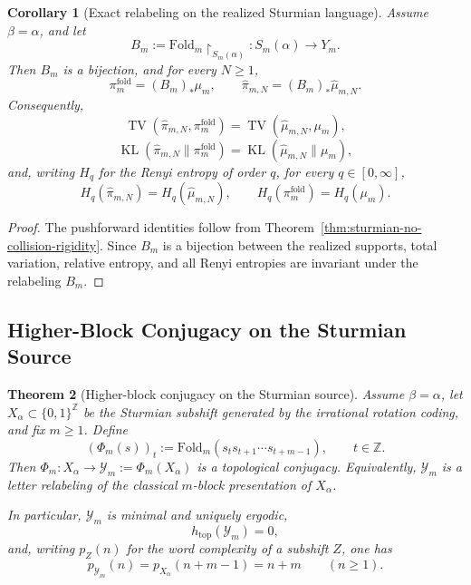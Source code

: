 \documentclass[11pt,letterpaper]{article}
\numberwithin{equation}{section}
\theoremstyle{plain}
\newtheorem{theorem}{Theorem}[section]
\newtheorem{corollary}[theorem]{Corollary}
\theoremstyle{definition}
\theoremstyle{remark}
\newcommand{\Fold}{\mathrm{Fold}}
\DeclareMathOperator{\TV}{TV}
\DeclareMathOperator{\KL}{KL}
\begin{document}
\begin{corollary}[Exact relabeling on the realized Sturmian language]\label{cor:sturmian-exact-relabeling}
Assume \(\beta=\alpha\), and let
\[
B_m:=\Fold_m\!\upharpoonright_{S_m(\alpha)}:S_m(\alpha)\to Y_m.
\]
Then \(B_m\) is a bijection, and for every \(N\ge 1\),
\[
\pi_m^{\mathrm{fold}}=(B_m)_*\mu_m,
\qquad
\hat\pi_{m,N}=(B_m)_*\hat\mu_{m,N}.
\]
Consequently,
\[
\TV(\hat\pi_{m,N},\pi_m^{\mathrm{fold}})
=
\TV(\hat\mu_{m,N},\mu_m),
\]
\[
\KL(\hat\pi_{m,N}\|\pi_m^{\mathrm{fold}})
=
\KL(\hat\mu_{m,N}\|\mu_m),
\]
and, writing \(H_q\) for the Renyi entropy of order \(q\), for every
\(q\in[0,\infty]\),
\[
H_q(\hat\pi_{m,N})=H_q(\hat\mu_{m,N}),
\qquad
H_q(\pi_m^{\mathrm{fold}})=H_q(\mu_m).
\]
\end{corollary}

\begin{proof}
The pushforward identities follow from Theorem~\ref{thm:sturmian-no-collision-rigidity}.
Since \(B_m\) is a bijection between the realized supports, total variation,
relative entropy, and all Renyi entropies are invariant under the relabeling
\(B_m\).
\end{proof}

\subsection{Higher-Block Conjugacy on the Sturmian Source}

\begin{theorem}[Higher-block conjugacy on the Sturmian source]
\label{thm:sequence-level-transparency}
Assume \(\beta=\alpha\), let \(X_\alpha\subset\{0,1\}^{\mathbb{Z}}\) be the
Sturmian subshift generated by the irrational rotation coding, and fix
\(m\ge 1\). Define
\[
(\Phi_m(s))_t:=\Fold_m(s_t s_{t+1}\cdots s_{t+m-1}),
\qquad t\in\mathbb{Z}.
\]
Then \(\Phi_m:X_\alpha\to \mathcal{Y}_m:=\Phi_m(X_\alpha)\) is a topological
conjugacy. Equivalently, \(\mathcal{Y}_m\) is a letter relabeling of the
classical \(m\)-block presentation of \(X_\alpha\).

In particular, \(\mathcal{Y}_m\) is minimal and uniquely ergodic,
\[
h_{\mathrm{top}}(\mathcal{Y}_m)=0,
\]
and, writing \(p_Z(n)\) for the word complexity of a subshift \(Z\), one has
\[
p_{\mathcal{Y}_m}(n)=p_{X_\alpha}(n+m-1)=n+m
\qquad (n\ge 1).
\]
\end{theorem}
\end{document}
